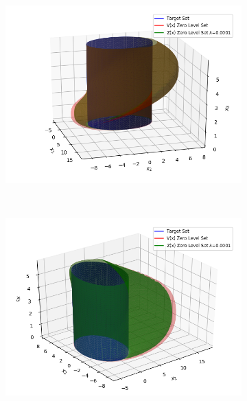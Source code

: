 \begin{figure}[t!]
    \centering
    \begin{subfigure}[t]{0.3\textwidth}
        \centering
        \includegraphics[scale=0.4]{air_3d_v1}
        \caption{}
    \end{subfigure}%
    ~ 
    \begin{subfigure}[t]{0.3\textwidth}
        \centering
        \includegraphics[scale=0.4]{air_3d_v2}
        \caption{}
    \end{subfigure}
    ~
    \begin{subfigure}[t]{0.3\textwidth}
        \centering

\end{subfigure}
\end{figure}
